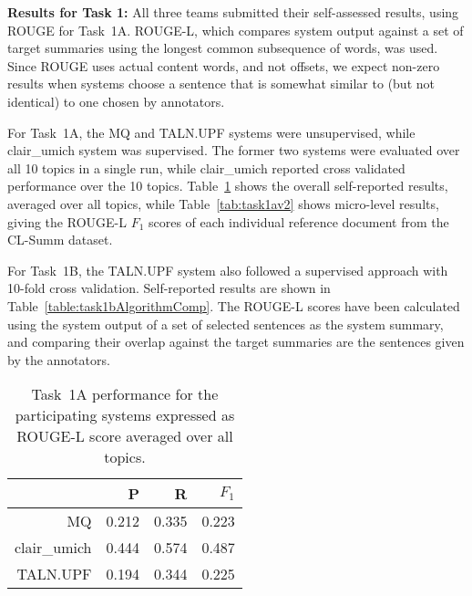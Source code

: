 \documentclass[11pt]{article}
\begin{document}
\textbf{Results for Task 1:} All three teams submitted their
self-assessed results, using ROUGE \cite{Lin:2004} for
Task~1A. ROUGE-L, which compares system output against a set of target
summaries using the longest common subsequence of words, was
used. Since ROUGE uses actual content words, and not offsets, we
expect non-zero results when systems choose a sentence that is
somewhat similar to (but not identical) to one chosen by annotators.

For Task~1A, the MQ and TALN.UPF systems were unsupervised, while
clair\_umich system was supervised. The former two systems were
evaluated over all 10 topics in a single run, while clair\_umich
reported cross validated performance over the 10 topics.
Table~\ref{tab:task1a} shows the overall self-reported results,
averaged over all topics, while Table~\ref{tab:task1av2} shows
micro-level results, giving the ROUGE-L $F_1$ scores of each
individual reference document from the CL-Summ dataset.

For Task~1B, the TALN.UPF system also followed a supervised approach
with 10-fold cross validation.  Self-reported results are shown in
Table~\ref{table:task1bAlgorithmComp}.  The ROUGE-L scores have been
calculated using the system output of a set of selected sentences as
the system summary, and comparing their overlap against the target
summaries are the sentences given by the annotators.

\begin{table}[t]
\centering
	\begin{tabular}{|r|r|r|r|}
	\hline
	& P & R & $F_1$ \\
	\hline
MQ & 	0.212& 0.335& 0.223 \\
clair\_umich & 0.444& 0.574& 0.487 \\
TALN.UPF & 0.194& 0.344& 0.225\\
\hline
\end{tabular}
\caption{Task~1A performance for the participating systems expressed as ROUGE-L score
 averaged over all topics.}
\label{tab:task1a}
\end{table}
\end{document}

